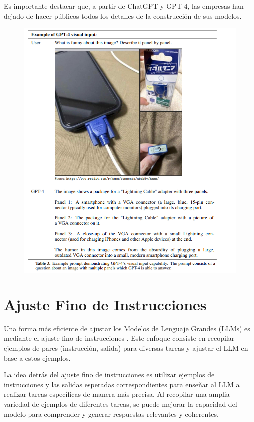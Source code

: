 Es importante destacar que, a partir de ChatGPT y GPT-4, las empresas han dejado de hacer públicos todos los detalles de la construcción de sus modelos.

\begin{figure}[h]
	\includegraphics[scale = 0.35]{pics/gpt4.png}
\end{figure}




\section{Ajuste Fino de Instrucciones}
Una forma más eficiente de ajustar los Modelos de Lenguaje Grandes (LLMs) es mediante el ajuste fino de instrucciones \cite{chung2022scaling}. Este enfoque consiste en recopilar ejemplos de pares (instrucción, salida) para diversas tareas y ajustar el LLM en base a estos ejemplos.

La idea detrás del ajuste fino de instrucciones es utilizar ejemplos de instrucciones y las salidas esperadas correspondientes para enseñar al LLM a realizar tareas específicas de manera más precisa. Al recopilar una amplia variedad de ejemplos de diferentes tareas, se puede mejorar la capacidad del modelo para comprender y generar respuestas relevantes y coherentes.


